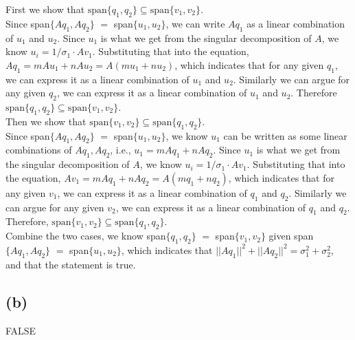 \documentclass[11pt]{article}
\begin{document}
First we show that $\text{span}\{q_1,q_2\} \subseteq \text{span}\{v_1,v_2\}$. \\
Since span$\{Aq_1,Aq_2\}$ $=$ span$\{u_1,u_2\}$, we can write $Aq_1$ as a linear combination of $u_1$ and $u_2$. Since $u_1$ is what we get from the singular decomposition of $A$, we know $u_i = 1/\sigma_1 \cdot A v_1$. Substituting that into the equation, $Aq_1 = m Au_1 + nAu_2 = A (mu_1 + nu_2)$, which indicates that for any given $q_1$, we can express it as a linear combination of $u_1$ and $u_2$. Similarly we can argue for any given $q_2$, we can express it as a linear combination of $u_1$ and $u_2$. Therefore $\text{span}\{q_1,q_2\} \subseteq \text{span}\{v_1,v_2\}$. \\ 


Then we show that $\text{span}\{v_1,v_2\} \subseteq \text{span}\{q_1,q_2\}$. \\
Since span$\{Aq_1,Aq_2\}$ $=$ span$\{u_1,u_2\}$, we know $u_1$ can be written as some linear combinations of $Aq_1,Aq_2$, i.e., $u_1 = m Aq_1 + n Aq_2$. Since $u_1$ is what we get from the singular decomposition of $A$, we know $u_i = 1/\sigma_1 \cdot A v_1$. Substituting that into the equation, $A v_1 = m Aq_1 + n Aq_2 = A (m q_1 + n q_2)$, which indicates that for any given $v_1$, we can express it as a linear combination of $q_1$ and $q_2$. Similarly we can argue for any given $v_2$, we can express it as a linear combination of $q_1$ and $q_2$. Therefore, $\text{span}\{v_1,v_2\} \subseteq \text{span}\{q_1,q_2\}$. \\

Combine the two cases, we know span$\{q_1,q_2\}$ $=$ span$\{v_1,v_2\}$ given span$\{Aq_1,Aq_2\}$ $=$ span$\{u_1,u_2\}$, which indicates that $||Aq_1||^2+||Aq_2||^2 = \sigma_1^2 + \sigma_2^2$, and that the statement is true.

\subsection*{(b)}
FALSE\\
\end{document}
